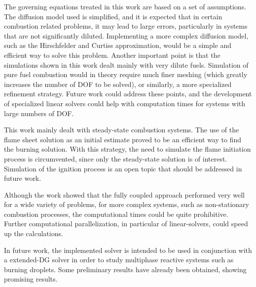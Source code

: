 The governing equations treated in this work are based on a set of assumptions.
The diffusion model used is simplified, and it is expected that in certain combustion related problems, it may lead to large errors, particularly in systems that are not significantly diluted. Implementing a more complex diffusion model, such as the Hirschfelder and Curtiss approximation, would be a simple and efficient way to solve this problem. 
Another important point is that the simulations shown in this work dealt mainly with very dilute fuels. Simulation of pure fuel combustion would in theory require much finer meshing (which greatly increases the number of DOF to be solved), or similarly, a more specialized refinement strategy. Future work could address these points, and the development of specialized linear solvers could help with computation times for systems with large numbers of DOF.

This work mainly dealt with steady-state combustion systems. The use of the flame sheet solution as an initial estimate proved to be an efficient way to find the burning solution. With this strategy, the need to simulate the flame initiation process is circumvented, since only the steady-state solution is of interest.  Simulation of the ignition process is an open topic that should be addressed in future work. 

Although the work showed that the fully coupled approach performed very well for a wide variety of problems, for more complex systems, such as non-stationary combustion processes, the computational times could be quite prohibitive. Further computational parallelization, in particular of linear-solvers, could speed up the calculations. 

In future work, the implemented solver is intended to be used in conjunction with a extended-DG solver \parencite{kummerExtendedDiscontinuousGalerkin2017,kummerBoSSSPackageMultigrid2021,krauseIncompressibleImmersedBoundary2017} in order to study multiphase reactive systems such as burning droplets. Some preliminary results have already been obtained, showing promising results. %

